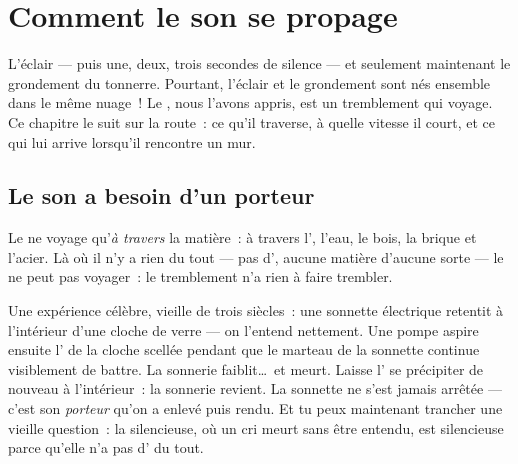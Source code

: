 \chapter{Comment le son se propage}\label{ch:g4:how-sound-travels}

L'éclair --- puis une, deux, trois secondes de silence --- et
seulement maintenant le grondement du tonnerre. Pourtant, l'éclair et
le grondement sont nés ensemble dans le même nuage~! Le , nous
l'avons appris, est un tremblement qui voyage. Ce chapitre le suit
sur la route~: ce qu'il traverse, à quelle vitesse il court, et ce
qui lui arrive lorsqu'il rencontre un mur.

\section{Le son a besoin d'un porteur}

\begin{proposition}\label{prop:g4:how-sound-travels:carrier}
Le  ne voyage qu'\emph{à travers} la matière~: à travers l',
l'eau, le bois, la brique et l'acier. Là où il n'y a rien du tout ---
pas d', aucune matière d'aucune sorte --- le  ne peut pas
voyager~: le tremblement n'a rien à faire trembler.
\end{proposition}

\begin{example}\label{ex:g4:how-sound-travels:jar}
Une expérience célèbre, vieille de trois siècles~: une sonnette
électrique retentit à l'intérieur d'une cloche de verre --- on
l'entend nettement. Une pompe aspire ensuite l' de la cloche
scellée pendant que le marteau de la sonnette continue visiblement de
battre. La sonnerie faiblit\dots\ et meurt. Laisse l' se
précipiter de nouveau à l'intérieur~: la sonnerie revient. La
sonnette ne s'est jamais arrêtée --- c'est son \emph{porteur} qu'on a
enlevé puis rendu. Et tu peux maintenant trancher une vieille
question~: la  silencieuse, où un cri meurt sans être entendu,
est silencieuse parce qu'elle n'a pas d' du tout.
\end{example}

